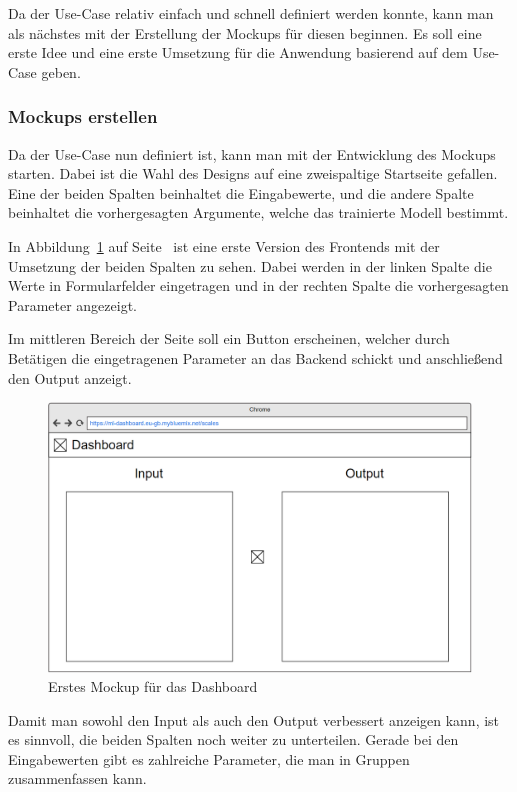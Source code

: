 Da der Use-Case relativ einfach und schnell definiert werden konnte, kann man als nächstes mit der Erstellung der
Mockups für diesen beginnen. Es soll eine erste Idee und eine erste Umsetzung für die Anwendung basierend auf dem
Use-Case geben.

\subsubsection{Mockups erstellen}
Da der Use-Case nun definiert ist, kann man mit der Entwicklung des Mockups starten. Dabei ist die Wahl des
Designs auf eine zweispaltige Startseite gefallen. Eine der beiden Spalten beinhaltet die Eingabewerte, und die andere
Spalte beinhaltet die vorhergesagten Argumente, welche das trainierte Modell bestimmt.

In Abbildung~\ref{fig:umsetzung_mockup_scale_1} auf Seite~\pageref{fig:umsetzung_mockup_scale_1} ist eine erste Version
des Frontends mit der Umsetzung der beiden Spalten zu sehen. Dabei werden in der linken Spalte die Werte in
Formularfelder eingetragen und in der rechten Spalte die vorhergesagten Parameter angezeigt.

Im mittleren Bereich der Seite soll ein Button erscheinen, welcher durch Betätigen die eingetragenen Parameter an das
Backend schickt und anschließend den Output anzeigt.

\begin{figure}[h]
    \centering
    \includegraphics[width=\textwidth]{images/kapitel_4/mockup_scale_1.png}
    \caption{Erstes Mockup für das Dashboard}
    \label{fig:umsetzung_mockup_scale_1}
\end{figure}

Damit man sowohl den Input als auch den Output verbessert anzeigen kann, ist es sinnvoll, die beiden Spalten noch weiter
zu unterteilen. Gerade bei den Eingabewerten gibt es zahlreiche Parameter, die man in Gruppen zusammenfassen kann.

